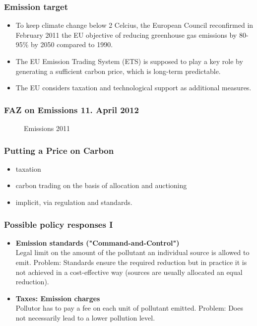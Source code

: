 \begin{frame}
\frametitle{Emission target}
\begin{itemize}
\item<1-> To keep climate change below 2 Celcius, the European Council reconfirmed in February
2011 the EU objective of reducing greenhouse gas emissions by 80-95\% by 2050 compared to
1990.
\item<2-> The EU Emission Trading System (ETS) is supposed to play a key role by generating a sufficient carbon price,
which is long-term predictable.
\item<3-> The EU  considers taxation and technological support as additional measures.
\end{itemize}
\end{frame}


\begin{frame}\frametitle{FAZ on Emissions 11. April 2012}
\begin{center}
\begin{figure}[h!]
\centering
{}
\caption{Emissions 2011}
\label{fig:abatement}
\end{figure}
\end{center}
\end{frame}



\begin{frame}
  \frametitle{Putting a Price on Carbon}
   \begin{itemize}
  \item<1-> taxation
  \item<2-> carbon trading on the basis of allocation and auctioning
  \item<3-> implicit, via regulation and standards.
  \end{itemize}
\end{frame}
\begin{frame}
  \frametitle{Possible policy responses I}
  \begin{itemize}
  \item<1-> \textbf{Emission standards ("Command-and-Control")} \\
        Legal limit on the amount of the pollutant an individual source is allowed to emit. %
        Problem: Standards ensure the required reduction but in practice it is not achieved in a cost-effective way (sources are usually allocated an equal reduction).
  \item<2-> \textbf{Taxes: Emission charges} \\
        Pollutor has to pay a fee on each unit of pollutant emitted. %
        Problem: Does not necessarily lead to a lower pollution level.
  \end{itemize}
  \end{frame}

